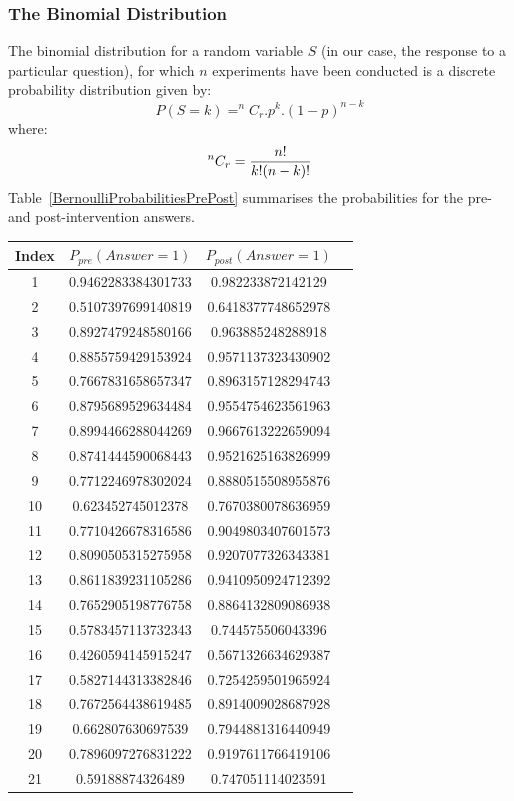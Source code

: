 \documentclass[10pt]{article}
\begin{document}
\subsubsection{The Binomial Distribution}
The binomial distribution for a random variable $S$ (in our case, the response to a particular question), for which $n$ experiments have been conducted is a discrete probability distribution given by:
\[P(S=k) =^{n}C_{r}.p^{k}.(1-p)^{n-k}\]
where:
\[^{n}C_{r} = {n!\over{k!(n-k)!}}\]
Table~\ref{BernoulliProbabilitiesPrePost} summarises the probabilities for the pre- and post-intervention answers.
\begin{longtable}{|c|c|c|c|}
	\hline
Index & $P_{pre}(Answer=1)$ &  $P_{post}(Answer=1)$\\
	\hline
1 & 0.9462283384301733 & 0.982233872142129 \\
2 & 0.5107397699140819 & 0.6418377748652978 \\
3 & 0.8927479248580166 & 0.963885248288918 \\
4 & 0.8855759429153924 & 0.9571137323430902 \\
5 & 0.7667831658657347 & 0.8963157128294743 \\
6 & 0.8795689529634484 & 0.9554754623561963 \\
7 & 0.8994466288044269 & 0.9667613222659094 \\
8 & 0.8741444590068443 & 0.9521625163826999 \\
9 & 0.7712246978302024 & 0.8880515508955876 \\
10 & 0.623452745012378 & 0.7670380078636959 \\
11 & 0.7710426678316586 & 0.9049803407601573 \\
12 & 0.8090505315275958 & 0.9207077326343381 \\
13 & 0.8611839231105286 & 0.9410950924712392 \\
14 & 0.7652905198776758 & 0.8864132809086938 \\
15 & 0.5783457113732343 & 0.744575506043396 \\
16 & 0.4260594145915247 & 0.5671326634629387 \\
17 & 0.5827144313382846 & 0.7254259501965924 \\
18 & 0.7672564438619485 & 0.8914009028687928 \\
19 & 0.662807630697539 & 0.7944881316440949 \\
20 & 0.7896097276831222 & 0.9197611766419106 \\
21 & 0.59188874326489 & 0.747051114023591 \\

\end{longtable}
\end{document}
